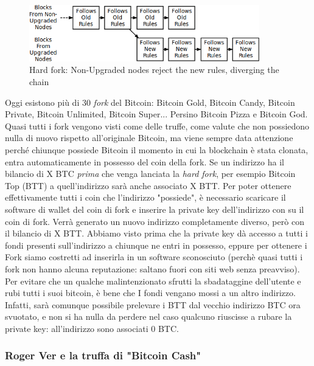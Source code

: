 \documentclass {article}
\begin{document}
{\vspace {0.5cm}
\begin {figure}[h]
\includegraphics [width = 10cm] {hard_fork.png}
\caption {Hard fork: Non-Upgraded nodes reject the new rules, diverging the chain}
\end {figure}
\vspace {0.5cm}
%
Oggi esistono più di 30 \textit{fork} del Bitcoin: Bitcoin Gold, Bitcoin Candy, Bitcoin Private, Bitcoin Unlimited, Bitcoin Super... Persino Bitcoin Pizza e Bitcoin God.
Quasi tutti i fork vengono visti come delle truffe, come valute che non possiedono nulla di nuovo rispetto all'originale Bitcoin, ma viene sempre data attenzione perché chiunque possiede Bitcoin il momento in cui la blockchain è stata clonata, entra automaticamente in possesso del coin della fork.
Se un indirizzo ha il bilancio di X BTC \emph{prima} che venga lanciata la \textit{hard fork}, per esempio Bitcoin Top (BTT) a quell'indirizzo sarà anche associato X BTT.
Per poter ottenere effettivamente tutti i coin che l'indirizzo "possiede", è necessario scaricare il software di wallet del coin di fork e inserire la private key dell'indirizzo con su il coin di fork.
Verrà generato un nuovo indirizzo completamente diverso, però con il bilancio di X BTT.
Abbiamo visto prima che la private key dà accesso a tutti i fondi presenti sull'indirizzo a chiunque ne entri in possesso, eppure per ottenere i Fork siamo costretti ad inserirla in un software sconosciuto (perchè quasi tutti i fork non hanno alcuna reputazione: saltano fuori con siti web senza preavviso).
Per evitare che un qualche malintenzionato sfrutti la sbadataggine dell'utente e rubi tutti i suoi bitcoin, è bene che I fondi vengano mossi a un altro indirizzo.
Infatti, sarà comunque possibile prelevare i BTT dal vecchio indirizzo BTC ora svuotato, e non si ha nulla da perdere nel caso qualcuno riuscisse a rubare la private key: all'indirizzo sono associati 0 BTC.


\subsubsection {Roger Ver e la truffa di "Bitcoin Cash"}


}
\end{document}
